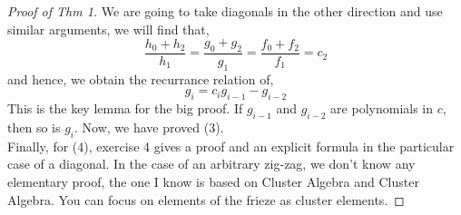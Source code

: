 \documentclass{article}
\begin{document}
\begin{proof}[Proof of Thm 1]
  We are going to take diagonals in the other direction and use similar arguments, we will find that,
  $$ \frac{h_0+h_2}{h_1} = \frac{g_0 + g_2}{g_1} = \frac{f_0 + f_2}{f_1} = c_2 $$
  and hence, we obtain the recurrance relation of,
  $$ g_i = c_ig_{i-1} - g_{i-2} $$
  This is the key lemma for the big proof. If $g_{i-1}$ and $g_{i-2}$ are polynomials in $c$, then so is $g_i$. Now, we have proved (3). \\

  Finally, for (4), exercise 4 gives a proof and an explicit formula in the particular case of a diagonal. In the case of an arbitrary zig-zag, we don't know any elementary proof, the one I know is based on Cluster Algebra and Cluster Algebra. You can focus on elements of the frieze as cluster elements.
\end{proof}
\end{document}
